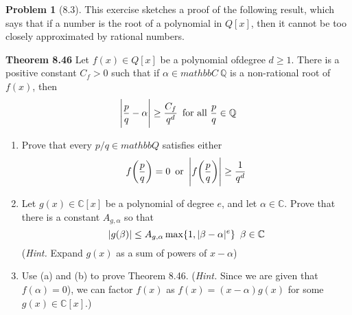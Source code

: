 \documentclass[12pt]{article}
\theoremstyle{definition}
\newtheorem{problem}{Problem}
\begin{document}
\begin{problem}[8.3]
    This exercise sketches a proof of the following result, which says that if a number is the root of 
    a polynomial in $Q[x]$, then it cannot be too closely approximated by rational numbers.

    \textbf{Theorem 8.46} Let $f(x) \in Q[x]$ be a polynomial ofdegree $d \geq 1$. There is a positive 
    constant $C_f > 0$ such that if $\alpha \in mathbb{C} \ \mathbb{Q}$ is a non-rational root of $f(x)$, then
    \[
        \Bigg| \frac{p}{q} - \alpha \Bigg| \geq \frac{C_f}{q^d} \hspace{5px} \text{for all } \frac{p}{q} \in \mathbb{Q}
    \]
    \begin{enumerate}[label=(\alph*)]
        \item Prove that every $p/q \in mathbb{Q}$ satisfies either
        \[
            f\bigg( \frac{p}{q} \bigg) = 0 \hspace{5px} \text{or} \hspace{5px} \Bigg| f\bigg( \frac{p}{q} \bigg) \Bigg| \geq \frac{1}{q^d}
        \]
        \begin{solution}

        \end{solution}

        \item Let $g(x) \in \mathbb{C}[x]$ be a polynomial of degree $e$, and let $\alpha \in \mathbb{C}$. Prove that there
              is a constant $A_{g, \alpha}$ so that
              \[
                |g(\beta)| \leq A_{g, \alpha} \max\{1, |\beta - \alpha|^e\} \hspace{5px} \beta \in \mathbb{C}
              \]
            (\textit{Hint.} Expand $g(x)$ as a sum of powers of $x - \alpha$)
        \begin{solution}

        \end{solution}

        \item Use (a) and (b) to prove Theorem 8.46. (\textit{Hint.} Since we are given that $f(\alpha) = 0$),
              we can factor $f(x)$ as $f(x) = (x - \alpha)g(x)$ for some $g(x) \in \mathbb{C}[x]$.)
        \begin{solution}

        \end{solution}
    \end{enumerate}
\end{problem}
\end{document}

